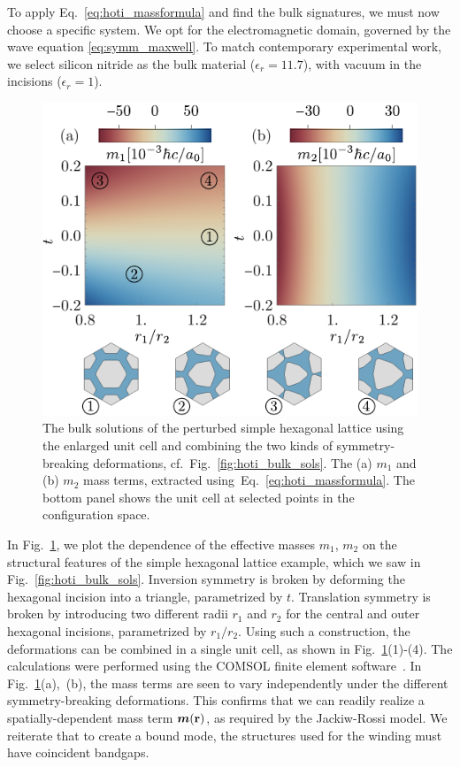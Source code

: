 To apply Eq.~\eqref{eq:hoti_massformula} and find the bulk signatures, we must now choose a specific system. We opt for the electromagnetic domain, governed by the wave equation \eqref{eq:symm_maxwell}. To match contemporary experimental work, we select silicon nitride as the bulk material ($\epsilon_r = 11.7$), with vacuum in the incisions ($\epsilon_r = 1$).
%
\begin{figure} [h!]
	\centering
	\hspace*{-5mm}
	\includegraphics[scale=0.9]{figures/hoti/fig3.pdf}
	\caption{The bulk solutions of the perturbed simple hexagonal lattice using the enlarged unit cell and combining the two kinds of symmetry-breaking deformations, cf.~Fig.~\ref{fig:hoti_bulk_sols}. The (a) $m_1$ and (b) $m_2$ mass terms, extracted using~Eq.~\eqref{eq:hoti_massformula}. The bottom panel shows the unit cell at selected points in the configuration space.}
	\label{fig:hoti_bulk_sig}
\end{figure} 
%
In Fig.~\ref{fig:hoti_bulk_sig}, we plot the dependence of the effective masses $m_1$, $m_2$ on the structural features of the simple hexagonal lattice example, which we saw in Fig.~\ref{fig:hoti_bulk_sols}. Inversion symmetry is broken by deforming the hexagonal incision into a triangle, parametrized by $t$. Translation symmetry is broken by introducing two different radii $r_1$ and $r_2$ for the central and outer hexagonal incisions, parametrized by $r_1/r_2$. Using such a construction, the deformations can be combined in a single unit cell, as shown in Fig.~\ref{fig:hoti_bulk_sig}(1)-(4). The calculations were performed using the COMSOL finite element software~\cite{comsol}. In Fig.~\ref{fig:hoti_bulk_sig}(a),~(b), the mass terms are seen to vary independently under the different symmetry-breaking deformations. This confirms that we can readily realize a spatially-dependent mass term $\boldsymbol{m}(\vb{r})$, as required by the Jackiw-Rossi model. We reiterate that to create a bound mode, the structures used for the winding must have coincident bandgaps.

